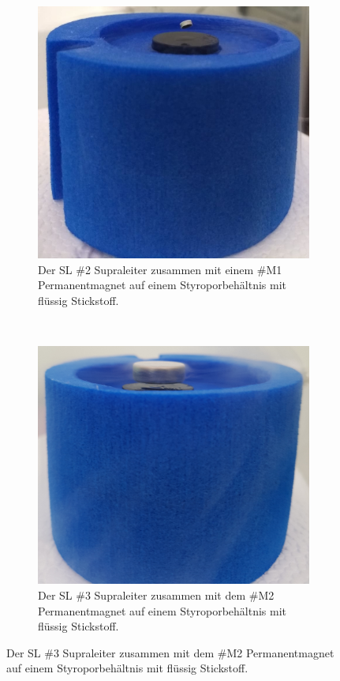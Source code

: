 \begin{figure}[H]
\centering
	\begin{subfigure}[t]{0.45\textwidth}
    \includegraphics[width=\textwidth]{Auswertung/SL_1.jpg}
    \caption{Der SL \#2 Supraleiter zusammen mit einem \#M1 Permanentmagnet auf einem Styroporbehältnis
    mit flüssig Stickstoff.}
    \label{fig:SL1}
	\end{subfigure}
	~
	\begin{subfigure}[t]{0.45\textwidth}
    \includegraphics[width=1.06\textwidth]{Auswertung/SL_2.jpg}
    \caption{Der SL \#3 Supraleiter zusammen mit dem \#M2 Permanentmagnet auf einem Styroporbehältnis
    mit flüssig Stickstoff.}
    \label{fig:SL2}
	\end{subfigure}
\end{figure}

